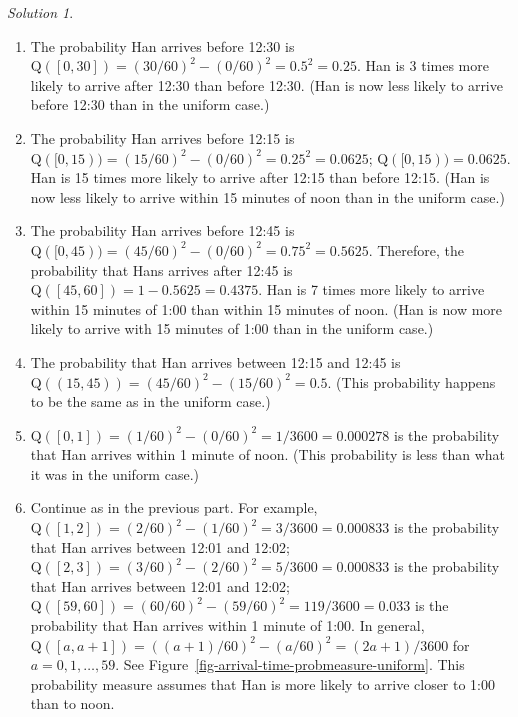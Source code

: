 \documentclass[
  letterpaper,
  DIV=11,
  numbers=noendperiod]{scrreprt}
\providecommand{\tightlist}{%
  \setlength{\itemsep}{0pt}\setlength{\parskip}{0pt}}
\theoremstyle{plain}
\theoremstyle{definition}
\theoremstyle{definition}
\theoremstyle{definition}
\theoremstyle{remark}
\newtheorem{refsolution}{Solution}[chapter]
\begin{document}
\begin{tcolorbox}[enhanced jigsaw, opacityback=0, rightrule=.15mm, coltitle=black, colframe=quarto-callout-tip-color-frame, toprule=.15mm, colbacktitle=quarto-callout-tip-color!10!white, opacitybacktitle=0.6, left=2mm, toptitle=1mm, breakable, title={Solution (click to expand)}, bottomtitle=1mm, colback=white, leftrule=.75mm, titlerule=0mm, arc=.35mm, bottomrule=.15mm]

\begin{refsolution}
\leavevmode

\begin{enumerate}
\def\labelenumi{\arabic{enumi}.}
\tightlist
\item
  The probability Han arrives before 12:30 is
  \(\textrm{Q}([0, 30]) = (30/60)^2 - (0/60)^2 =0.5^2 =0.25\). Han is 3
  times more likely to arrive after 12:30 than before 12:30. (Han is now
  less likely to arrive before 12:30 than in the uniform case.)
\item
  The probability Han arrives before 12:15 is
  \(\textrm{Q}([0, 15)) = (15/60)^2 - (0/60)^2 =0.25^2 = 0.0625\);
  \(\textrm{Q}([0, 15)) = 0.0625\). Han is 15 times more likely to
  arrive after 12:15 than before 12:15. (Han is now less likely to
  arrive within 15 minutes of noon than in the uniform case.)
\item
  The probability Han arrives before 12:45 is
  \(\textrm{Q}([0, 45)) = (45/60)^2 - (0/60)^2 =0.75^2 = 0.5625\).
  Therefore, the probability that Hans arrives after 12:45 is
  \(\textrm{Q}([45, 60]) = 1 - 0.5625 = 0.4375\). Han is 7 times more
  likely to arrive within 15 minutes of 1:00 than within 15 minutes of
  noon. (Han is now more likely to arrive with 15 minutes of 1:00 than
  in the uniform case.)
\item
  The probability that Han arrives between 12:15 and 12:45 is
  \(\textrm{Q}((15, 45)) = (45/60)^2-(15/60)^2 = 0.5\). (This
  probability happens to be the same as in the uniform case.)
\item
  \(\textrm{Q}([0, 1]) = (1/60)^2 - (0/60)^2 = 1/3600 = 0.000278\) is
  the probability that Han arrives within 1 minute of noon. (This
  probability is less than what it was in the uniform case.)
\item
  Continue as in the previous part. For example,
  \(\textrm{Q}([1, 2]) = (2/60)^2 - (1/60)^2 = 3/3600 = 0.000833\) is
  the probability that Han arrives between 12:01 and 12:02;
  \(\textrm{Q}([2, 3]) = (3/60)^2 - (2/60)^2 = 5/3600 = 0.000833\) is
  the probability that Han arrives between 12:01 and 12:02;
  \(\textrm{Q}([59, 60]) = (60/60)^2 - (59/60)^2 = 119/3600 = 0.033\) is
  the probability that Han arrives within 1 minute of 1:00. In general,
  \(\textrm{Q}([a, a+1]) = ((a+1)/60)^2 - (a/60)^2 = (2a+1)/3600\) for
  \(a = 0, 1, \ldots, 59\). See
  Figure~\ref{fig-arrival-time-probmeasure-uniform}. This probability
  measure assumes that Han is more likely to arrive closer to 1:00 than
  to noon.
\end{enumerate}

\label{sol-meeting-nonuniform-probspace1}

\end{refsolution}

\end{tcolorbox}
\end{document}
